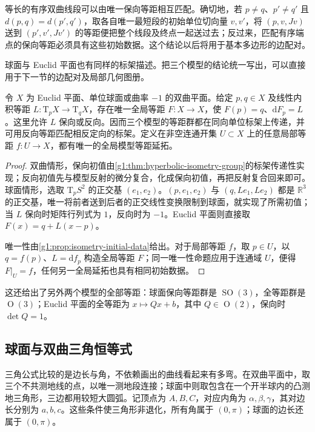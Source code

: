 等长的有序双曲线段可以由唯一保向等距相互匹配。确切地，若 \(p\ne q\)、\(p'\ne q'\) 且 \(d(p,q)=d(p',q')\)，取各自唯一最短段的初始单位切向量 \(v,v'\)，将 \((p,v,Jv)\) 送到 \((p',v',Jv')\) 的等距便把整个线段及终点一起送过去；反过来，匹配有序端点的保向等距必须具有这些初始数据。这个结论以后将用于基本多边形的边配对。

\ProseParagraphBreak

球面与 Euclid 平面也有同样的标架描述。把三个模型的结论统一写出，可以直接用于下一节的边配对及局部几何图册。

\begin{proposition}
	\label{g1:prop:model-isometry-data}
	令 \(X\) 为 Euclid 平面、单位球面或曲率 \(-1\) 的双曲平面。给定 \(p,q\in X\) 及线性内积等距 \(L:\mathrm{T}_pX\to \mathrm{T}_qX\)，存在唯一全局等距 \(F:X\to X\)，使 \(F(p)=q\)、\(\mathrm{d}F_p=L\)。这里允许 \(L\) 保向或反向。因而三个模型的等距群都在同向单位标架上传递，并可用反向等距匹配相反定向的标架。定义在非空连通开集 \(U\subset X\) 上的任意局部等距 \(f:U\to X\)，都有唯一的全局模型等距延拓。
\end{proposition}
\begin{proof}
	双曲情形，保向初值由\cref{g1:thm:hyperbolic-isometry-group}的标架传递性实现；反向初值先与模型反射的微分复合，化成保向初值，再把反射复合回来即可。球面情形，选取 \(\mathrm{T}_pS^2\) 的正交基 \((e_1,e_2)\)。\((p,e_1,e_2)\) 与 \((q,Le_1,Le_2)\) 都是 \(\mathbb R^3\) 的正交基，唯一将前者送到后者的正交线性变换限制到球面，就实现了所需初值；当 \(L\) 保向时矩阵行列式为 \(1\)，反向时为 \(-1\)。Euclid 平面则直接取 \(F(x)=q+L(x-p)\)。

	唯一性由\cref{g1:prop:isometry-initial-data}给出。对于局部等距 \(f\)，取 \(p\in U\)，以 \(q=f(p)\)、\(L=\mathrm{d}f_p\) 构造全局等距 \(F\)；同一唯一性命题应用于连通域 \(U\)，便得 \(F|_U=f\)，任何另一全局延拓也具有相同初始数据。
\end{proof}

这还给出了另外两个模型的全部等距：球面保向等距群是 \(\operatorname{SO}(3)\)，全等距群是 \(\operatorname{O}(3)\)；Euclid 平面的全等距为 \(x\mapsto Qx+b\)，其中 \(Q\in\operatorname{O}(2)\)，保向时 \(\det Q=1\)。

\subsection{球面与双曲三角恒等式}
\label{g1:subsec:1001:05}

三角公式比较的是边长与角，不依赖画出的曲线看起来有多弯。在双曲平面中，取三个不共测地线的点，以唯一测地段连接；球面中则取包含在一个开半球内的凸测地三角形，三边都用较短大圆弧。记顶点为 \(A,B,C\)，对应内角为 \(\alpha,\beta,\gamma\)，其对边长分别为 \(a,b,c\)。这些条件使三角形非退化，所有角属于 \((0,\pi)\)；球面的边长还属于 \((0,\pi)\)。

